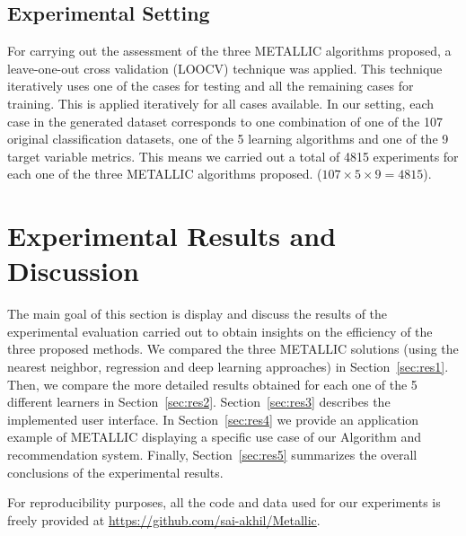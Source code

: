\documentclass{article}
\begin{document}
\subsection{Experimental Setting}
For carrying out the assessment of the three METALLIC algorithms proposed, a leave-one-out cross validation (LOOCV) technique was applied. This technique iteratively uses one of the cases for testing and all the remaining cases for training. This is applied iteratively for all cases available. In our setting, each case in the generated dataset corresponds to one combination of one of the 107 original classification datasets, one of the 5 learning algorithms and one of the 9 target variable metrics. This means we carried out a total of 4815 experiments for each one of the three METALLIC algorithms proposed. ($107 \times 5 \times 9 = 4815$).



\section{Experimental Results and Discussion}\label{sec:results}
The main goal of this section is display and discuss the results of the experimental evaluation carried out to obtain insights on the efficiency of the three proposed methods. We compared the three METALLIC solutions (using the nearest neighbor, regression and deep learning approaches) in Section~\autoref{sec:res1}. Then, we compare the more detailed results obtained for each one of the 5 different learners in Section~\autoref{sec:res2}. Section~\autoref{sec:res3} describes the implemented user interface. In Section~\autoref{sec:res4} we provide an application example of METALLIC displaying a specific use case of our Algorithm and recommendation system. Finally, Section~\autoref{sec:res5} summarizes the overall conclusions of the experimental results. 

For reproducibility purposes, all the code and data used for our experiments is freely provided at \url{https://github.com/sai-akhil/Metallic}.
\end{document}

